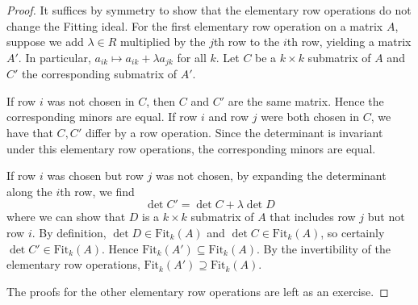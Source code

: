 \begin{proof}
	It suffices by symmetry to show that the elementary row operations do not change the Fitting ideal.
	For the first elementary row operation on a matrix \( A \), suppose we add \( \lambda \in R \) multiplied by the \( j \)th row to the \( i \)th row, yielding a matrix \( A' \).
	In particular, \( a_{ik} \mapsto a_{ik} + \lambda a_{jk} \) for all \( k \).
	Let \( C \) be a \( k \times k \) submatrix of \( A \) and \( C' \) the corresponding submatrix of \( A' \).

	If row \( i \) was not chosen in \( C \), then \( C \) and \( C' \) are the same matrix.
	Hence the corresponding minors are equal.
	If row \( i \) and row \( j \) were both chosen in \( C \), we have that \( C, C' \) differ by a row operation.
	Since the determinant is invariant under this elementary row operations, the corresponding minors are equal.

	If row \( i \) was chosen but row \( j \) was not chosen, by expanding the determinant along the \( i \)th row, we find
	\[ \det C' = \det C + \lambda \det D \]
	where we can show that \( D \) is a \( k \times k \) submatrix of \( A \) that includes row \( j \) but not row \( i \).
	By definition, \( \det D \in \mathrm{Fit}_k(A) \) and \( \det C \in \mathrm{Fit}_k(A) \), so certainly \( \det C' \in \mathrm{Fit}_k(A) \).
	Hence \( \mathrm{Fit}_k(A') \subseteq \mathrm{Fit}_k(A) \).
	By the invertibility of the elementary row operations, \( \mathrm{Fit}_k(A') \supseteq \mathrm{Fit}_k(A) \).

	The proofs for the other elementary row operations are left as an exercise.
\end{proof}

